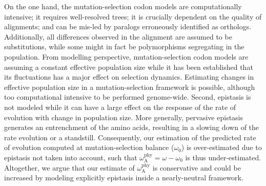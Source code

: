 \documentclass{article}
\newcommand{\rateApop}{\omega_{\mathrm{A}}}
\newcommand{\rateAphy}{\rateApop^{\mathrm{phy}}}
\begin{document}
    On the one hand, the mutation-selection codon models are computationally intensive; it requires well-resolved trees; it is crucially dependent on the quality of alignments; and can be mis-led by paralogs erroneously identified as orthologs.
    Additionally, all differences observed in the alignment are assumed to be substitutions, while some might in fact be polymorphisms segregating in the population\cite{mugal_why_2014}.
    From modelling perspective, mutation-selection codon models are assuming a constant effective population size while it has been established that its fluctuations has a major effect on selection dynamics\cite{lanfear_population_2014, platt_protein_2018}.
    Estimating changes in effective population size in a mutation-selection framework is possible\cite{latrille_inferring_2021}, although too computational intensive to be performed genome-wide.
    Second, epistasis is not modeled while it can have a large effect on the response of the rate of evolution with change in population size\cite{latrille_quantifying_2021}.
    More generally, pervasive epistasis generates an entrenchment of the amino acids\cite{goldstein_evolutionary_2004, goldstein_nonadaptive_2015, goldstein_sequence_2017}, resulting in a slowing down of the rate evolution\cite{rodrigue_detecting_2017, patel_epistasis_2022} or a standstill\cite{youssef_evolution_2022}.
    Consequently, our estimation of the predicted rate of evolution computed at mutation-selection balance ($\omega_0$) is over-estimated due to epistasis not taken into account, such that $\rateAphy = \omega - \omega_{0}$ is thus under-estimated.
    Altogether, we argue that our estimate of $\rateAphy$ is conservative and could be increased by modeling explicitly epistasis inside a nearly-neutral framework\cite{goldstein_sequence_2017}.
\end{document}
